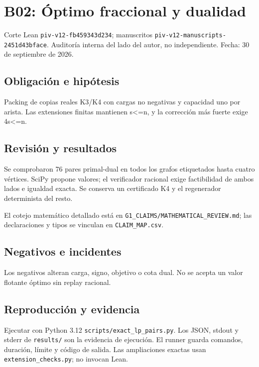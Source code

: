 \section{B02: Óptimo fraccional y
dualidad}\label{b02-uxf3ptimo-fraccional-y-dualidad}

Corte Lean \texttt{piv-v12-fb459343d234}; manuscritos
\texttt{piv-v12-manuscripts-2451d43bface}. Auditoría interna del lado
del autor, no independiente. Fecha: 30 de septiembre de 2026.

\subsection{Obligación e hipótesis}\label{obligaciuxf3n-e-hipuxf3tesis}

Packing de copias reales K3/K4 con cargas no negativas y capacidad uno
por arista. Las extensiones finitas mantienen s\textless=n, y la
corrección más fuerte exige 4s\textless=n.

\subsection{Revisión y resultados}\label{revisiuxf3n-y-resultados}

Se comprobaron 76 pares primal-dual en todos los grafos etiquetados
hasta cuatro vértices. SciPy propone valores; el verificador racional
exige factibilidad de ambos lados e igualdad exacta. Se conserva un
certificado K4 y el regenerador determinista del resto.

El cotejo matemático detallado está en
\texttt{G1\_CLAIMS/MATHEMATICAL\_REVIEW.md}; las declaraciones y tipos
se vinculan en \texttt{CLAIM\_MAP.csv}.

\subsection{Negativos e incidentes}\label{negativos-e-incidentes}

Los negativos alteran carga, signo, objetivo o cota dual. No se acepta
un valor flotante óptimo sin replay racional.

\subsection{Reproducción y evidencia}\label{reproducciuxf3n-y-evidencia}

Ejecutar con Python 3.12 \texttt{scripts/exact\_lp\_pairs.py}. Los JSON,
stdout y stderr de \texttt{results/} son la evidencia de ejecución. El
runner guarda comandos, duración, límite y código de salida. Las
ampliaciones exactas usan \texttt{extension\_checks.py}; no invocan
Lean.

